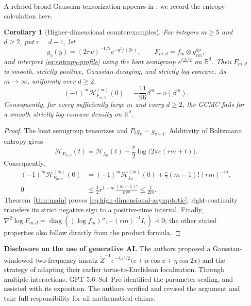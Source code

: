 \documentclass[10pt,letterpaper,journal]{IEEEtran}
\newcommand{\R}{\mathbb{R}}
\newcommand{\cH}{\mathcal{H}}
\theoremstyle{plain}
\newtheorem{corollary}[theorem]{Corollary}
\theoremstyle{definition}
\newcommand{\finalcolumnbalance}{}
\begin{document}
A related broad-Gaussian tensorization appears in
\cite{ZouFanGaoWang2026}; we record the entropy calculation here.

\begin{corollary}[Higher-dimensional counterexamples]
\label{cor:high-dimensional}
For integers $m\ge5$ and $d\ge2$, put $r=d-1$, let
\[
 g_v(y)=(2\pi v)^{-1/2}e^{-y^2/(2v)},
 \qquad F_{m,d}=f_m\otimes g_{rm}^{\otimes r},
\]
and interpret \eqref{eq:entropy-profile} using the heat semigroup
$e^{t\Delta/2}$ on $\R^d$. Then $F_{m,d}$ is smooth, strictly positive,
Gaussian-decaying, and strictly log-concave. As $m\to\infty$, uniformly over
$d\ge2$,
\begin{equation}
 (-1)^m\cH_{F_{m,d}}^{(m)}(0)
 =-\frac{11}{96}\beta^m+o(\beta^m).
 \label{eq:high-dimensional-asymptotic}
\end{equation}
Consequently, for every sufficiently large $m$ and every $d\ge2$, the GCMC
fails for a smooth strictly log-concave density on $\R^d$.
\end{corollary}

\begin{proof}
The heat semigroup tensorizes and $P_tg_v=g_{v+t}$. Additivity of Boltzmann
entropy gives
\[
 \cH_{F_{m,d}}(t)
 =\cH_{f_m}(t)-\frac{r}{2}\log\!\bigl(2\pi e(rm+t)\bigr).
\]
Consequently,
\begin{align*}
 (-1)^m\cH_{F_{m,d}}^{(m)}(0)
 &=(-1)^m\cH_{f_m}^{(m)}(0)
 +\frac{r}{2}(m-1)!(rm)^{-m},\\
 0&\le\frac12r^{1-m}\frac{(m-1)!}{m^m}\le\frac{1}{2m}.
\end{align*}
Theorem~\ref{thm:main} proves
\eqref{eq:high-dimensional-asymptotic}; right-continuity transfers its strict
negative sign to a positive-time interval. Finally,
$\nabla^2\log F_{m,d}=\operatorname{diag}((\log f_m)'',-(rm)^{-1}I_r)\prec0$;
the other stated properties also follow directly from the product formula.
\end{proof}

\finalcolumnbalance
\noindent\textbf{Disclosure on the use of generative AI.}
The authors proposed a Gaussian-windowed two-frequency ansatz
$\widetilde Z^{-1}e^{-\lambda x^2/2}
\bigl(c+\alpha\cos x+\eta\cos2x\bigr)$ and the strategy of adapting their
earlier torus-to-Euclidean localization. Through multiple interactions,
\mbox{GPT-5.6 Sol Pro} identified the parameter scaling, and assisted with its
exposition. The authors verified and revised the
argument and take full responsibility for all mathematical claims.
 
\end{document}
